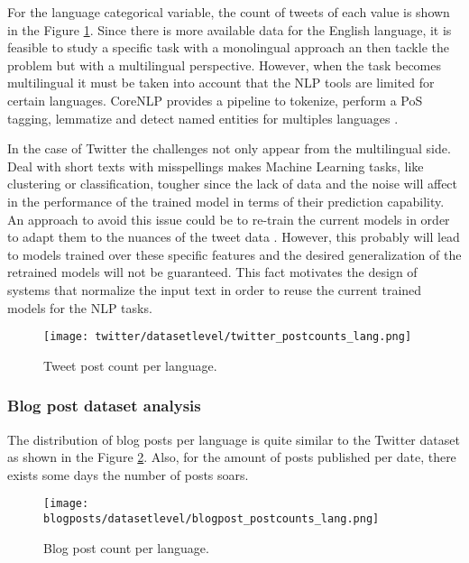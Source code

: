 \par For the language categorical variable, the count of tweets of each value is shown in the Figure \ref{fig:twitter_postcounts_lang}. Since there is more available data for the English language, it is feasible to study a specific task with a monolingual approach an then tackle the problem but with a multilingual perspective. However, when the task becomes multilingual it must be taken into account that the NLP tools are limited for certain languages. CoreNLP provides a pipeline to tokenize, perform a PoS tagging, lemmatize and detect named entities for multiples languages \citep{coreNlp}. 
\par In the case of Twitter the challenges not only appear from the multilingual side. Deal with short texts with misspellings makes Machine Learning tasks, like clustering or classification, tougher since the lack of data and the noise will affect in the performance of the trained model in terms of their prediction capability. An approach to avoid this issue could be to re-train the current models in order to adapt them to the nuances of the tweet data \citep{synthesisLecturesSocial}. However, this probably will lead to models trained over these specific features and the desired generalization of the retrained models will not be guaranteed. This fact motivates the design of systems that normalize the input text in order to reuse the current trained models for the NLP tasks.
\begin{figure}[H]
	\begin{center}
		\texttt{[image: twitter/datasetlevel/twitter\_postcounts\_lang.png]}
		\caption{Tweet post count per language.}
		\label{fig:twitter_postcounts_lang}
	\end{center}
\end{figure}
\subsubsection{Blog post dataset analysis}
The distribution of blog posts per language is quite similar to the Twitter dataset as shown in the Figure \ref{fig:blogpost_postcounts_lang}. Also, for the amount of posts published per date, there exists some days the number of posts soars.
\begin{figure}[H]
	\begin{center}
		\texttt{[image: blogposts/datasetlevel/blogpost\_postcounts\_lang.png]}
		\caption{Blog post count per language.}
		\label{fig:blogpost_postcounts_lang}
	\end{center}
\end{figure}

